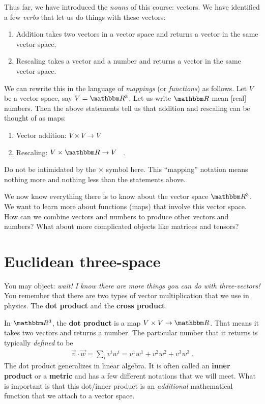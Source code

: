 Thus far, we have introduced the \emph{nouns} of this course: vectors. We have identified a few \emph{verbs} that let us do things with these vectors:
\begin{enumerate}
    \item Addition takes two vectors in a vector space and returns a vector in the same vector space. 
    \item Rescaling takes a vector and a number and returns a vector in the same vector space.
\end{enumerate}
We can rewrite this in the language of \emph{mappings} (or \emph{functions}) as follows. Let $V$ be a vector space, say $V=\RR ^3$. Let us write $\RR $ mean [real] numbers. Then the above statements tell us that addition and rescaling can be thought of as maps:
\begin{enumerate}
    \item Vector addition: $V\times V \to V$
    \item Rescaling: $V\times \RR  \to V$ \ .
\end{enumerate}
Do not be intimidated by the $\times$ symbol here. This ``mapping'' notation means nothing more and nothing less than the statements above.

We now know everything there is to know about the vector space $\RR ^3$. We want to learn more about functions (maps) that involve this vector space. How can we combine vectors and numbers to produce other vectors and numbers? What about more complicated objects like matrices and tensors? 

\section{Euclidean three-space}

You may object: \emph{wait! I know there are more things you can do with three-vectors!} You remember that there are two types of vector multiplication that we use in physics. The \textbf{dot product} and the \textbf{cross product}. 

In $\RR ^3$, the \textbf{dot product} is a map $V\times V \to \RR $. That means it takes two vectors and returns a number. The particular number that it returns is typically \emph{defined} to be
\begin{align}
    \vec{v} \cdot \vec{w} 
    = \sum_i v^i w^i  
    = v^1w^1 + v^2 w^2 + v^3w^3 \ .
    \label{eq:euclidean:3d:metric:intro}
\end{align}
The dot product generalizes in linear algebra. It is often called an \textbf{inner product} or a \textbf{metric} and has a few different notations that we will meet. What is important is that this dot/inner product is an \emph{additional} mathematical function that we attach to a vector space. 

